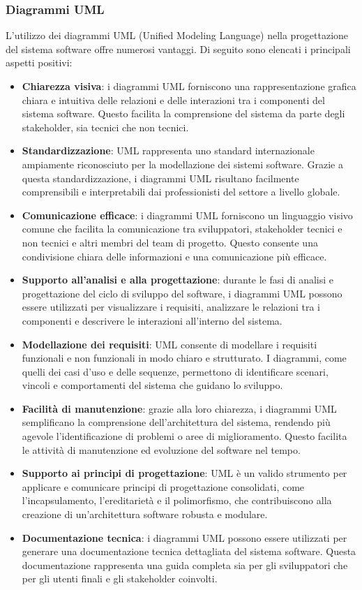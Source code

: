 \subsubsection{Diagrammi UML}
L'utilizzo dei diagrammi UML (Unified Modeling Language) nella progettazione del sistema software offre numerosi vantaggi. Di seguito sono elencati i principali aspetti positivi:
\begin{itemize}
    \item \textbf{Chiarezza visiva}: i diagrammi UML forniscono una rappresentazione grafica chiara e intuitiva delle relazioni e delle interazioni tra i componenti del sistema software. Questo facilita la comprensione del sistema da parte degli stakeholder, sia tecnici che non tecnici.
    \item \textbf{Standardizzazione}: UML rappresenta uno standard internazionale ampiamente riconosciuto per la modellazione dei sistemi software. Grazie a questa standardizzazione, i diagrammi UML risultano facilmente comprensibili e interpretabili dai professionisti del settore a livello globale.
    \item \textbf{Comunicazione efficace}: i diagrammi UML forniscono un linguaggio visivo comune che facilita la comunicazione tra sviluppatori, stakeholder tecnici e non tecnici e altri membri del team di progetto. Questo consente una condivisione chiara delle informazioni e una comunicazione più efficace.
    \item \textbf{Supporto all'analisi e alla progettazione}: durante le fasi di analisi e progettazione del ciclo di sviluppo del software, i diagrammi UML possono essere utilizzati per visualizzare i requisiti, analizzare le relazioni tra i componenti e descrivere le interazioni all'interno del sistema.
    \item \textbf{Modellazione dei requisiti}: UML consente di modellare i requisiti funzionali e non funzionali in modo chiaro e strutturato. I diagrammi, come quelli dei casi d'uso e delle sequenze, permettono di identificare scenari, vincoli e comportamenti del sistema che guidano lo sviluppo.
    \item \textbf{Facilità di manutenzione}: grazie alla loro chiarezza, i diagrammi UML semplificano la comprensione dell'architettura del sistema, rendendo più agevole l'identificazione di problemi o aree di miglioramento. Questo facilita le attività di manutenzione ed evoluzione del software nel tempo.
    \item \textbf{Supporto ai principi di progettazione}: UML è un valido strumento per applicare e comunicare principi di progettazione consolidati, come l'incapsulamento, l'ereditarietà e il polimorfismo, che contribuiscono alla creazione di un'architettura software robusta e modulare.
    \item \textbf{Documentazione tecnica}: i diagrammi UML possono essere utilizzati per generare una documentazione tecnica dettagliata del sistema software. Questa documentazione rappresenta una guida completa sia per gli sviluppatori che per gli utenti finali e gli stakeholder coinvolti.
\end{itemize}


